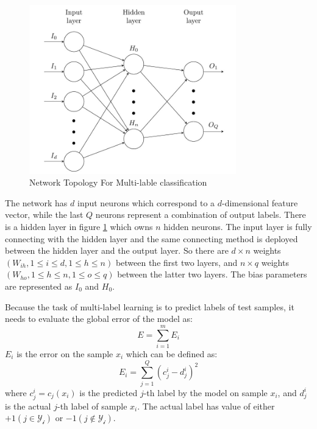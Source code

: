 \graphicspath{ {./Figures/} }
\begin{figure}[!htb]
\centering
\includegraphics[width=0.8\textwidth]{MultiLabelNet.jpeg}
\caption{\label{fig:MultiLabelNet}Network Topology For Multi-lable classification}
\end{figure}

The network has $d$ input neurons which correspond to a $d$-dimensional feature vector, while the last $Q$ neurons represent a combination of output labels. There is a hidden layer in figure \ref{fig:MultiLabelNet} which owns $n$ hidden neurons. The input layer is fully connecting with the hidden layer and the same connecting method is deployed between the hidden layer and the output layer. So there are $d \times n$ weights $(W_{ih}, 1 \leq i \leq d, 1 \leq h \leq n)$ between the first two layers, and $n \times q$ weights $(W_{ho}, 1 \leq h \leq n , 1 \leq o \leq q)$ between the latter two layers. The bias parameters are represented as $I_{0}$ and  $H_{0}$.

Because the task of multi-label learning is to predict labels of test samples, it needs to evaluate the global error of the model as:
\begin{equation}\label{eq:MultiLableError}
E = \sum_{i=1}^m E_{i}
\end{equation}
$E_{i}$ is the error on the sample $x_{i}$ which can be defined as:
\begin{equation}\label{eq:MultiLableSamError}
E_{i} = \sum_{j=1}^Q (c_{j}^i - d_{j}^i)^2
\end{equation}
where $c_{j}^i = c_{j}(x_{i})$ is the predicted $j$-th label by the model on sample $x_{i}$, and $d_{j}^i$ is the actual $j$-th label of sample $x_{i}$. The actual label has value of either $+1 (j \in \mathcal{Y_{i}})$ or $-1 (j \notin \mathcal{Y_{i}})$.

